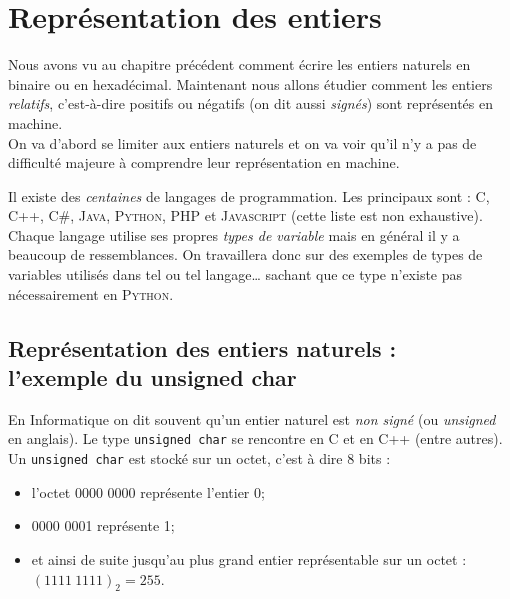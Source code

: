 \chapter{Représentation des entiers}

Nous avons vu au chapitre précédent comment écrire les entiers naturels en binaire ou en hexadécimal. Maintenant nous allons
étudier comment les entiers \textit{relatifs}, c'est-à-dire positifs ou négatifs (on dit aussi \textit{signés}) sont
représentés en machine.\\
On va d'abord se limiter aux entiers naturels et on va voir qu'il n'y a pas de difficulté majeure à comprendre leur représentation en machine.


\begin{remarque}[ importante]
    Il existe des \textit{centaines} de langages de programmation. Les principaux sont : \textsc{C},  \textsc{C++}, \textsc{C\#}, \textsc{Java},
    \textsc{Python}, \textsc{PHP} et \textsc{Javascript} (cette liste est non exhaustive). Chaque langage utilise ses propres \textit{types de variable}
    mais en général il y a beaucoup de ressemblances. On travaillera donc sur des exemples de types de variables utilisés dans tel ou tel langage\ldots
    sachant que ce type n'existe pas nécessairement en \textsc{Python}.
\end{remarque}

\section{Représentation des entiers naturels :\\ l'exemple du unsigned char}

En Informatique on dit souvent qu'un entier naturel est \textit{non signé} (ou \textit{unsigned} en anglais). Le type \texttt{unsigned char} se
rencontre en \textsc{C} et en \textsc{C++} (entre autres).\\

Un \texttt{unsigned char} est stocké sur un octet, c'est à dire 8 bits :
\begin{itemize}
    \item   l'octet 0000 0000 représente l'entier 0;
    \item   0000 0001 représente 1;
    \item   et ainsi de suite jusqu'au plus grand entier représentable sur un octet : \\$(1111\ 1111)_2=255$.
\end{itemize}

